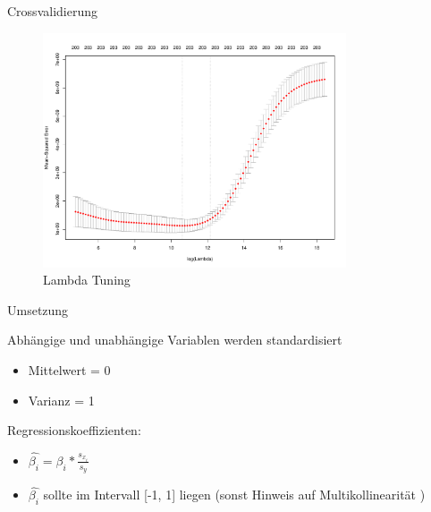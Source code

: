 \documentclass[10pt]{beamer}
\begin{document}
\begin{frame}{Crossvalidierung}

    \begin{figure}
        \centering
        \includegraphics[width=0.8\textwidth, keepaspectratio]{figures/ridge_tuning.pdf}
        \caption{Lambda Tuning}
    \end{figure}
    
\end{frame}



\begin{frame}{Umsetzung}
	
	\begin{Large}{Abhängige und unabhängige Variablen werden standardisiert}\end{Large}
	
	\begin{itemize}
		\item Mittelwert = 0
		\item Varianz = 1
	\end{itemize}
	
	\begin{Large}{Regressionskoeffizienten:}\end{Large}
		\begin{itemize}
     	       \item $\hat{\beta_i} = \beta_i*\frac{s_{x_i}}{s_y}$
     	       \item $\hat{\beta_i}$ sollte im Intervall [-1, 1] liegen (sonst Hinweis auf Multikollinearität )
		\end{itemize}
	
\end{frame}
\end{document}
